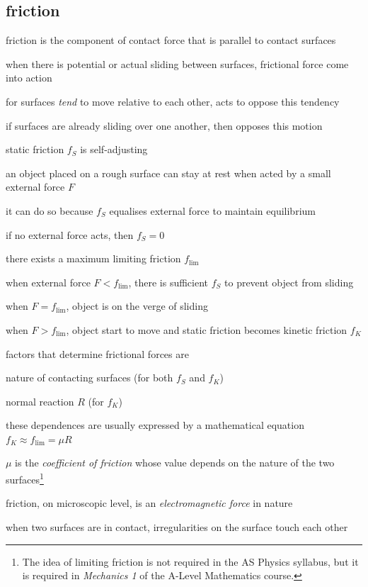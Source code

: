 \subsection{friction}

friction is the component of contact force that is parallel to contact surfaces

when there is potential or actual sliding between surfaces, frictional force come into action

\titem for surfaces \emph{tend} to move relative to each other,  acts to oppose this tendency

\titem if surfaces are already sliding over one another, then  opposes this motion

\cmt static friction $f_S$ is self-adjusting

an object placed on a rough surface can stay at rest when acted by a small external force $F$

it can do so because $f_S$ equalises external force to maintain equilibrium

if no external force acts, then $f_S=0$

\cmt there exists a maximum limiting friction $f_\text{lim}$

when external force $F < f_\text{lim}$, there is sufficient $f_S$ to prevent object from sliding

when $F = f_\text{lim}$, object is on the verge of sliding

when $F>f_\text{lim}$, object start to move and static friction becomes kinetic friction $f_K$

\cmt factors that determine frictional forces are

\titem nature of contacting surfaces (for both $f_S$ and $f_K$)

\titem normal reaction $R$ (for $f_K$)

these dependences are usually expressed by a mathematical equation $\boxed{f_K \approx f_\text{lim} = \mu R}$

$\mu$ is the \emph{coefficient of friction} whose value depends on the nature of the two surfaces\footnote{The idea of limiting friction is not required in the AS Physics syllabus, but it is required in \emph{Mechanics 1} of the A-Level Mathematics course.}

\cmt friction, on microscopic level, is an \emph{electromagnetic force} in nature

when two surfaces are in contact, irregularities on the surface touch each other

